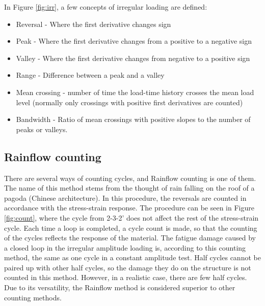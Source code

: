 In Figure \ref{fig:irr}, a few concepts of irregular loading are defined:
\begin{itemize}
\item Reversal - Where the first derivative changes sign
    \item Peak - Where the first derivative changes from a positive to a negative sign
    \item Valley - Where the first derivative changes from negative to a positive sign
    \item Range - Difference between a peak and a valley
    \item Mean crossing - number of time the load-time history crosses the mean load level (normally only crossings with positive first derivatives are counted)
    \item Bandwidth - Ratio of mean crossings with positive slopes to the number of peaks or valleys. 
\end{itemize}
 
\subsection{Rainflow counting}
\label{sec:rainflow}
There are several ways of counting cycles, and Rainflow counting is one of them. The name of this method stems from the thought of rain falling on the roof of a pagoda (Chinese architecture). In this procedure, the reversals are counted in accordance with the stress-strain response. The procedure can be seen in Figure \ref{fig:count}, where the cycle from 2-3-2' does not affect the rest of the stress-strain cycle. Each time a loop is completed, a cycle count is made, so that the counting of the cycles reflects the response of the material. The fatigue damage caused by a closed loop in the irregular amplitude loading is, according to this counting method, the same as one cycle in a constant amplitude test. Half cycles cannot be paired up with other half cycles, so the damage they do on the structure is not counted in this method. However, in a realistic case, there are few half cycles. Due to its versatility, the Rainflow method is considered superior to other counting methods. 

